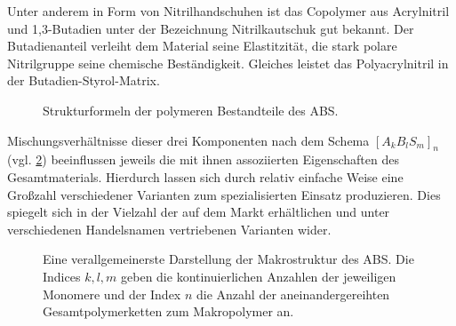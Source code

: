             Unter anderem in Form von Nitrilhandschuhen ist das Copolymer aus Acrylnitril und
            1,3-Butadien unter der Bezeichnung Nitrilkautschuk gut bekannt. Der Butadienanteil verleiht dem Material seine Elastitzität,
            die stark polare Nitrilgruppe seine chemische Beständigkeit. Gleiches leistet das Polyacrylnitril in der Butadien-Styrol-Matrix.
            \begin{figure}[H]%
                \centering
                \qquad
                \qquad
                \caption[Strukturformeln der polymeren Bestandteile des ABS]{Strukturformeln der polymeren Bestandteile des ABS.}%
                \label{fig:strukturformeln polymere}%
            \end{figure}
            
            Mischungsverhältnisse dieser drei Komponenten nach dem Schema \(\left[A_kB_lS_m\right]_n\) (vgl. \cref{fig:abs_struktur}) beeinflussen jeweils
            die mit ihnen assoziierten Eigenschaften des Gesamtmaterials. Hierdurch lassen sich durch relativ einfache Weise eine Großzahl verschiedener Varianten zum
            spezialisierten Einsatz produzieren. Dies spiegelt sich in der Vielzahl der auf dem Markt erhältlichen und unter
            verschiedenen Handelsnamen vertriebenen Varianten wider.
            \begin{figure}[H]
                \centering
                \caption[Verallgemeinerte Darstellung der Makrostruktur des Polymers]{Eine verallgemeinerste Darstellung der Makrostruktur des ABS. Die Indices \(k,l,m\) geben
                die kontinuierlichen Anzahlen der jeweiligen Monomere und der Index \(n\) die Anzahl der aneinandergereihten Gesamtpolymerketten zum Makropolymer an.}
                \label{fig:abs_struktur}
            \end{figure}
